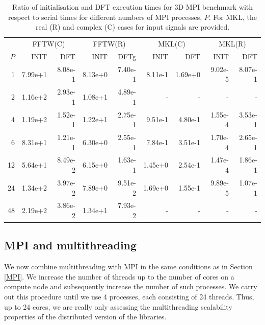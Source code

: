 \documentclass[12pt, a4paper]{article} \setlength{\textheight}{24cm}
\begin{document}
\begin{small}
\begin{table}[H]
  \centering
  \begin{tabular}{|r|rr|rr|rr|rr|}
    \hline
    & \multicolumn{2}{|c|}{FFTW(C)} & \multicolumn{2}{|c|}{FFTW(R)} & \multicolumn{2}{|c|}{MKL(C)} &   \multicolumn{2}{|c|}{MKL(R)}   \\
   $P$ & INIT & DFT & INIT & DFTg & INIT & DFT & INIT & DFT  \\
    \hline
   1 &   7.99e+1 &   8.08e-1 &   8.13e+0 &   7.40e-1 &   8.11e-1 &   1.69e+0 &   9.02e-5 &   8.07e-1 \\
   2 &   1.16e+2 &   2.93e-1 &   1.08e+1 &   4.89e-1 &  - & - & - & - \\
   4 &   1.19e+2 &   1.52e-1 &   1.22e+1 &   2.75e-1 &   9.51e-1 &   4.80e-1 &   1.55e-4 &   3.53e-1 \\
   6 &   8.31e+1 &   1.21e-1 &   6.30e+0 &   2.55e-1 &   7.84e-1 &   3.51e-1 &   1.70e-4 &   2.65e-1 \\
   12 &  5.64e+1 &   8.49e-2 &   6.15e+0 &   1.63e-1 &   1.45e+0 &   2.54e-1 &   1.47e-4 &   1.86e-1 \\
   24 &  1.34e+2 &   3.97e-2 &   7.89e+0 &   9.51e-2 &   1.69e+0 &   1.55e-1 &   9.89e-5 &   1.07e-1 \\
   48 &  2.19e+2 &   3.86e-2 &   1.34e+1 &   7.93e-2 &  - & - & - & - \\
    \hline
  \end{tabular}
  \caption{Ratio of initialisation and DFT execution times for 3D MPI benchmark with respect to serial times for different numbers of MPI processes, $P.$ For MKL, the real (R) and complex (C) cases for input signals are provided.}\label{Tbl:MPI3DScale}
\end{table}
\end{small}



\subsection{MPI and multithreading}\label{MPIMULTH}
We now combine multithreading with MPI in the same conditions as in
Section \ref{MPI}. We increase the number of threads up to the number
of cores on a compute node and subsequently increase the number of
such processes. We carry out this procedure until we use 4 processes,
each consisting of 24 threads. Thus, up to 24 cores, we are really only
assessing the multithreading scalability properties of the distributed
version of the libraries.
\end{document}
